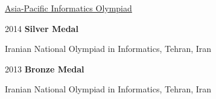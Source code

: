 \documentclass[letterpaper]{article}
\renewenvironment{itemize}{
  \begin{list}{}{
    \setlength{\leftmargin}{1.5em}
  }
}{
  \end{list}
}
\begin{document}
\begin{itemize}
        \hspace*{30pt}
        \begin{small}
            \href{http://apio-olympiad.org/2014/apio2014_official_results.pdf}{Asia-Pacific Informatics Olympiad}
        \end{small}
    \item 2014 \hspace*{10pt} \textbf{Silver Medal}\\
        \hspace*{30pt}
        \begin{small}
             Iranian National Olympiad in Informatics, Tehran, Iran
        \end{small}
    \item 2013 \hspace*{10pt} \textbf{Bronze Medal}\\
        \hspace*{30pt}
        \begin{small}
             Iranian National Olympiad in Informatics, Tehran, Iran
        \end{small}
\end{itemize}
\end{document}
